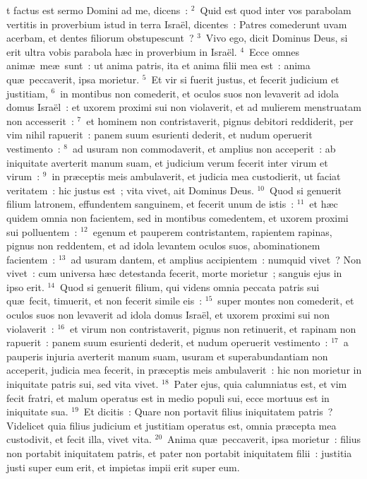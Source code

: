\bchapter
{}t factus est sermo Domini ad me, dicens~:
${}^{2}$~Quid est quod inter vos parabolam vertitis in proverbium istud in terra Isra\"el, dicentes~: Patres comederunt uvam acerbam, et dentes filiorum obstupescunt~?
${}^{3}$~Vivo ego, dicit Dominus Deus, si erit ultra vobis parabola h\ae c in proverbium in Isra\"el.
${}^{4}$~Ecce omnes anim\ae\ me\ae\ sunt~: ut anima patris, ita et anima filii mea est~: anima qu\ae\ peccaverit, ipsa morietur.
${}^{5}$~Et vir si fuerit justus, et fecerit judicium et justitiam,
${}^{6}$~in montibus non comederit, et oculos suos non levaverit ad idola domus Isra\"el~: et uxorem proximi sui non violaverit, et ad mulierem menstruatam non accesserit~:
${}^{7}$~et hominem non contristaverit, pignus debitori reddiderit, per vim nihil rapuerit~: panem suum esurienti dederit, et nudum operuerit vestimento~:
${}^{8}$~ad usuram non commodaverit, et amplius non acceperit~: ab iniquitate averterit manum suam, et judicium verum fecerit inter virum et virum~:
${}^{9}$~in pr\ae ceptis meis ambulaverit, et judicia mea custodierit, ut faciat veritatem~: hic justus est~; vita vivet, ait Dominus Deus.
${}^{10}$~Quod si genuerit filium latronem, effundentem sanguinem, et fecerit unum de istis~:
${}^{11}$~et h\ae c quidem omnia non facientem, sed in montibus comedentem, et uxorem proximi sui polluentem~:
${}^{12}$~egenum et pauperem contristantem, rapientem rapinas, pignus non reddentem, et ad idola levantem oculos suos, abominationem facientem~:
${}^{13}$~ad usuram dantem, et amplius accipientem~: numquid vivet~? Non vivet~: cum universa h\ae c detestanda fecerit, morte morietur~; sanguis ejus in ipso erit.
${}^{14}$~Quod si genuerit filium, qui videns omnia peccata patris sui qu\ae\ fecit, timuerit, et non fecerit simile eis~:
${}^{15}$~super montes non comederit, et oculos suos non levaverit ad idola domus Isra\"el, et uxorem proximi sui non violaverit~:
${}^{16}$~et virum non contristaverit, pignus non retinuerit, et rapinam non rapuerit~: panem suum esurienti dederit, et nudum operuerit vestimento~:
${}^{17}$~a pauperis injuria averterit manum suam, usuram et superabundantiam non acceperit, judicia mea fecerit, in pr\ae ceptis meis ambulaverit~: hic non morietur in iniquitate patris sui, sed vita vivet.
${}^{18}$~Pater ejus, quia calumniatus est, et vim fecit fratri, et malum operatus est in medio populi sui, ecce mortuus est in iniquitate sua.
${}^{19}$~Et dicitis~: Quare non portavit filius iniquitatem patris~? Videlicet quia filius judicium et justitiam operatus est, omnia pr\ae cepta mea custodivit, et fecit illa, vivet vita.
${}^{20}$~Anima qu\ae\ peccaverit, ipsa morietur~: filius non portabit iniquitatem patris, et pater non portabit iniquitatem filii~: justitia justi super eum erit, et impietas impii erit super eum.


